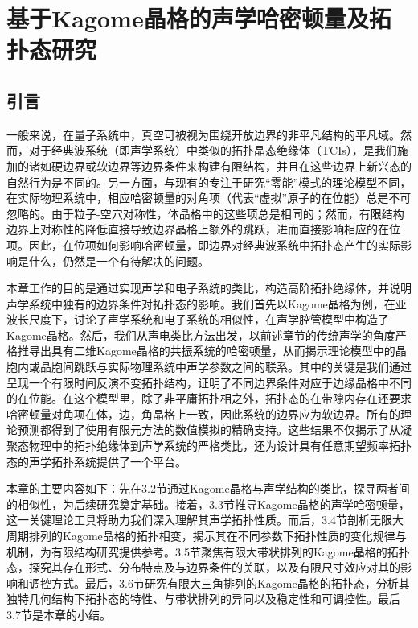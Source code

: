 \chapter{基于Kagome晶格的声学哈密顿量及拓扑态研究}

\section{引言}

一般来说，在量子系统中，真空可被视为围绕开放边界的非平凡结构的平凡域。然而，对于经典波系统（即声学系统）中类似的拓扑晶态绝缘体（TCIs），是我们施加的诸如硬边界或软边界等边界条件来构建有限结构，并且在这些边界上新兴态的自然行为是不同的。另一方面，与现有的专注于研究“零能”模式的理论模型不同，在实际物理系统中，相应哈密顿量的对角项（代表“虚拟”原子的在位能）总是不可忽略的。由于粒子-空穴对称性，体晶格中的这些项总是相同的；然而，有限结构边界上对称性的降低直接导致边界晶格上额外的跳跃，进而直接影响相应的在位项。因此，在位项如何影响哈密顿量，即边界对经典波系统中拓扑态产生的实际影响是什么，仍然是一个有待解决的问题。

本章工作的目的是通过实现声学和电子系统的类比，构造高阶拓扑绝缘体，并说明声学系统中独有的边界条件对拓扑态的影响。我们首先以Kagome晶格为例，在亚波长尺度下，讨论了声学系统和电子系统的相似性，在声学腔管模型中构造了Kagome晶格。然后，我们从声电类比方法出发，以前述章节的传统声学的角度严格推导出具有二维Kagome晶格的共振系统的哈密顿量，从而揭示理论模型中的晶胞内或晶胞间跳跃与实际物理系统中声学参数之间的联系。其中的关键是我们通过呈现一个有限时间反演不变拓扑结构，证明了不同边界条件对应于边缘晶格中不同的在位能。在这个模型里，除了非平庸拓扑相之外，拓扑态的在带隙内存在还要求哈密顿量对角项在体，边，角晶格上一致，因此系统的边界应为软边界。所有的理论预测都得到了使用有限元方法的数值模拟的精确支持。这些结果不仅揭示了从凝聚态物理中的拓扑绝缘体到声学系统的严格类比，还为设计具有任意期望频率拓扑态的声学拓扑系统提供了一个平台。

本章的主要内容如下：先在3.2节通过Kagome晶格与声学结构的类比，探寻两者间的相似性，为后续研究奠定基础。接着，3.3节推导Kagome晶格的声学哈密顿量，这一关键理论工具将助力我们深入理解其声学拓扑性质。而后，3.4节剖析无限大周期排列的Kagome晶格的拓扑相变，揭示其在不同参数下拓扑性质的变化规律与机制，为有限结构研究提供参考。3.5节聚焦有限大带状排列的Kagome晶格的拓扑态，探究其存在形式、分布特点及与边界条件的关联，以及有限尺寸效应对其的影响和调控方式。最后，3.6节研究有限大三角排列的Kagome晶格的拓扑态，分析其独特几何结构下拓扑态的特性、与带状排列的异同以及稳定性和可调控性。最后3.7节是本章的小结。


